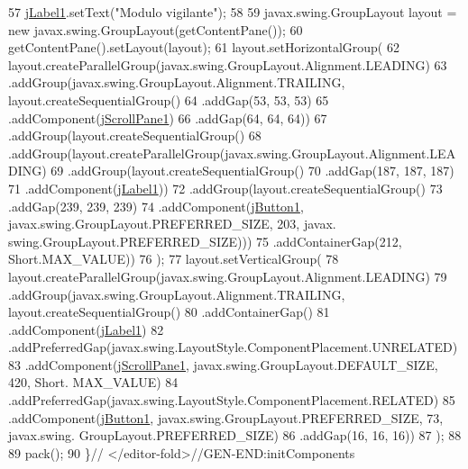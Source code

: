 \begin{DoxyCode}
57         \mbox{\hyperlink{classpecl6part2_1_1_modulo_vigilante_a3997466e501d43312cb2638eb1f743c0}{jLabel1}}.setText(\textcolor{stringliteral}{"Modulo vigilante"});
58 
59         javax.swing.GroupLayout layout = \textcolor{keyword}{new} javax.swing.GroupLayout(getContentPane());
60         getContentPane().setLayout(layout);
61         layout.setHorizontalGroup(
62             layout.createParallelGroup(javax.swing.GroupLayout.Alignment.LEADING)
63             .addGroup(javax.swing.GroupLayout.Alignment.TRAILING, layout.createSequentialGroup()
64                 .addGap(53, 53, 53)
65                 .addComponent(\mbox{\hyperlink{classpecl6part2_1_1_modulo_vigilante_a27f20917a0609de2eccd3550c9bfc8ca}{jScrollPane1}})
66                 .addGap(64, 64, 64))
67             .addGroup(layout.createSequentialGroup()
68                 .addGroup(layout.createParallelGroup(javax.swing.GroupLayout.Alignment.LEADING)
69                     .addGroup(layout.createSequentialGroup()
70                         .addGap(187, 187, 187)
71                         .addComponent(\mbox{\hyperlink{classpecl6part2_1_1_modulo_vigilante_a3997466e501d43312cb2638eb1f743c0}{jLabel1}}))
72                     .addGroup(layout.createSequentialGroup()
73                         .addGap(239, 239, 239)
74                         .addComponent(\mbox{\hyperlink{classpecl6part2_1_1_modulo_vigilante_a1e6500588306c2830853cb56b0e21c6a}{jButton1}}, javax.swing.GroupLayout.PREFERRED\_SIZE, 203, javax.
      swing.GroupLayout.PREFERRED\_SIZE)))
75                 .addContainerGap(212, Short.MAX\_VALUE))
76         );
77         layout.setVerticalGroup(
78             layout.createParallelGroup(javax.swing.GroupLayout.Alignment.LEADING)
79             .addGroup(javax.swing.GroupLayout.Alignment.TRAILING, layout.createSequentialGroup()
80                 .addContainerGap()
81                 .addComponent(\mbox{\hyperlink{classpecl6part2_1_1_modulo_vigilante_a3997466e501d43312cb2638eb1f743c0}{jLabel1}})
82                 .addPreferredGap(javax.swing.LayoutStyle.ComponentPlacement.UNRELATED)
83                 .addComponent(\mbox{\hyperlink{classpecl6part2_1_1_modulo_vigilante_a27f20917a0609de2eccd3550c9bfc8ca}{jScrollPane1}}, javax.swing.GroupLayout.DEFAULT\_SIZE, 420, Short.
      MAX\_VALUE)
84                 .addPreferredGap(javax.swing.LayoutStyle.ComponentPlacement.RELATED)
85                 .addComponent(\mbox{\hyperlink{classpecl6part2_1_1_modulo_vigilante_a1e6500588306c2830853cb56b0e21c6a}{jButton1}}, javax.swing.GroupLayout.PREFERRED\_SIZE, 73, javax.swing.
      GroupLayout.PREFERRED\_SIZE)
86                 .addGap(16, 16, 16))
87         );
88 
89         pack();
90     \}\textcolor{comment}{// </editor-fold>//GEN-END:initComponents}
\end{DoxyCode}
\mbox{\label{classpecl6part2_1_1_modulo_vigilante_acfd165e42bad1854ee98d3740a9f4ffa}} 
